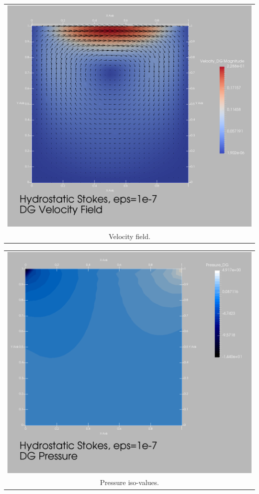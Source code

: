 \documentclass[25pt, a0paper, portrait, leqno, margin=0mm, innermargin=25mm,
blockverticalspace=15mm, colspace=15mm, subcolspace=8mm]{tikzposter}
\begin{document}
{\begin{multicols*}{4}
    \begin{tabular}{@{}c@{}}
      \includegraphics[width=1.0\linewidth]{hydstokes-DG-cavity-vel}
      \\
      Velocity field.
    \end{tabular}
    \begin{tabular}{@{}c@{}}
      \includegraphics[width=1.0\linewidth]{hydstokes-DG-cavity-pres}
      \\
      Pressure iso-values.
    \end{tabular}
  \end{multicols*}
}
\end{document}
